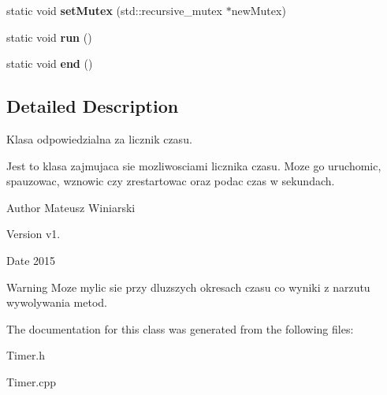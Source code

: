 \begin{DoxyCompactItemize}
\item 
\hypertarget{class_timer_a963623dd91d8379685d31add61ae54af}{}static void {\bfseries set\+Mutex} (std\+::recursive\+\_\+mutex $\ast$new\+Mutex)\label{class_timer_a963623dd91d8379685d31add61ae54af}

\item 
\hypertarget{class_timer_a1323444ebd7f2c1407518a03a193b5f4}{}static void {\bfseries run} ()\label{class_timer_a1323444ebd7f2c1407518a03a193b5f4}

\item 
\hypertarget{class_timer_af8c9d9213ff483fb73c82132c9b097ff}{}static void {\bfseries end} ()\label{class_timer_af8c9d9213ff483fb73c82132c9b097ff}

\end{DoxyCompactItemize}


\subsection{Detailed Description}
Klasa odpowiedzialna za licznik czasu. 

Jest to klasa zajmujaca sie mozliwosciami licznika czasu. Moze go uruchomic, spauzowac, wznowic czy zrestartowac oraz podac czas w sekundach. \begin{DoxyAuthor}{Author}
Mateusz Winiarski 
\end{DoxyAuthor}
\begin{DoxyVersion}{Version}
v1. 
\end{DoxyVersion}
\begin{DoxyDate}{Date}
2015 
\end{DoxyDate}
\begin{DoxyWarning}{Warning}
Moze mylic sie przy dluzszych okresach czasu co wyniki z narzutu wywolywania metod. 
\end{DoxyWarning}


The documentation for this class was generated from the following files\+:\begin{DoxyCompactItemize}
\item 
Timer.\+h\item 
Timer.\+cpp\end{DoxyCompactItemize}
